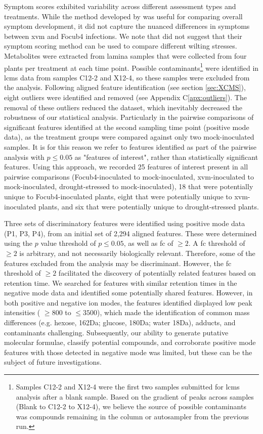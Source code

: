 Symptom scores exhibited variability across different assessment types and treatments. While the method developed by \textcite{Garcia-Bastidas2019} was useful for comparing overall symptom development, it did not capture the nuanced differences in symptoms between \ac{xvm} and \ac{Focub4} infections. We note that \textcite{Garcia-Bastidas2019} did not suggest that their symptom scoring method can be used to compare different wilting stresses.
\bigskip
\noindent
Metabolites were extracted from lamina samples that were collected from four plants per treatment at each time point. Possible contaminants\footnote{Samples C12-2 and X12-4 were the first two samples submitted for \ac{lcms} analysis after a blank sample. Based on the gradient of peaks across samples (Blank to C12-2 to X12-4), we believe the source of possible contaminants was compounds remaining in the column or autosampler from the previous run.} were identified in \ac{lcms} data from samples C12-2 and X12-4, so these samples were excluded from the analysis. Following aligned feature identification (see section \ref{sec:XCMS}), eight outliers were identified and removed (see Appendix C\ref{apx:outliers}). The removal of these outliers reduced the dataset, which inevitably decreased the robustness of our statistical analysis. Particularly in the pairwise comparisons of significant features identified at the second sampling time point (positive mode data), as the treatment groups were compared against only two mock-inoculated samples. It is for this reason we refer to features identified as part of the pairwise analysis with $p \le 0.05$ as "features of interest", rather than statistically significant features. Using this approach, we recorded 25 features of interest present in all pairwise comparisons (\ac{Focub4}-inoculated to mock-inoculated, \ac{xvm}-inoculated to mock-inoculated, drought-stressed to mock-inoculated), 18 that were potentially unique to \ac{Focub4}-inoculated plants, eight that were potentially unique to \ac{xvm}-inoculated plants, and six that were potentially unique to drought-stressed plants. 

Three sets of discriminatory features were identified using positive mode data (P1, P3, P4), from an initial set of 2,294 aligned features. These were determined using the $p$ value threshold of $p \le 0.05$, as well as \ac{fc} of $\geq2$. A \ac{fc} threshold of $\geq2$ is arbitrary, and not necessarily biologically relevant. Therefore, some of the features excluded from the analysis may be discriminant. However, the \ac{fc} threshold of $\geq2$ facilitated the discovery of potentially related features based on retention time. We searched for features with similar retention times in the negative mode data and identified some potentially shared features. However, in both positive and negative ion modes, the features identified displayed low peak intensities ( $\geq800$ to $\leq3500$), which made the identification of common mass differences (e.g. hexose, 162Da; glucose, 180Da; water 18Da), adducts, and contaminants challenging. Subsequently, our ability to generate putative molecular formulae, classify potential compounds, and corroborate positive mode features with those detected in negative mode was limited, but these can be the subject of future investigations.

